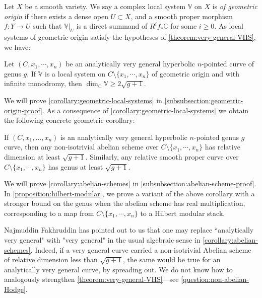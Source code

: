 Let $X$ be a smooth variety. We say a complex local system $\mathbb{V}$ on $X$ is \emph{of geometric origin} if there exists a dense open $U\subset X$, and a smooth proper morphism $f: Y\to U$ such that $\mathbb{V}|_U$ is a direct summand of $R^if_*\mathbb{C}$ for some $i\geq 0$. As local systems of geometric origin satisfy the hypotheses of \autoref{theorem:very-general-VHS}, we have:
\begin{corollary}
\notready\label{corollary:geometric-local-systems}
Let $(C, x_1, \cdots, x_n)$ be an analytically very general hyperbolic $n$-pointed curve of genus $g$. If $\mathbb{V}$ is a local system on $C\setminus\{x_1, \cdots, x_n\}$ of geometric origin and with infinite monodromy, then $\dim_{\mathbb{C}}\mathbb{V}\geq 2\sqrt{g+1}$.
\end{corollary}
We will prove \autoref{corollary:geometric-local-systems}
in \autoref{subsubsection:geometric-origin-proof}.
As a consequence of \autoref{corollary:geometric-local-systems}
we obtain the following concrete geometric corollary:
\begin{corollary}
\notready
	\label{corollary:abelian-schemes}
	If $(C, x_1, \ldots, x_n)$ is an analytically
very general hyperbolic $n$-pointed genus $g$ curve, then any non-isotrivial
abelian scheme over $C\setminus\{x_1, \cdots, x_n\}$  has relative dimension at least $\sqrt{g+1}$.
	Similarly, any relative smooth proper curve over $C\setminus\{x_1, \cdots, x_n\}$
	has genus at least $\sqrt{g+1}$.
\end{corollary}
We will prove \autoref{corollary:abelian-schemes}
in \autoref{subsubsection:abelian-scheme-proof}.
In \autoref{proposition:hilbert-modular},
we prove a variant of the above corollary
with a stronger bound on the genus
when the abelian scheme has real multiplication, corresponding to a map from
$C\setminus\{x_1, \cdots, x_n\}$ to a Hilbert modular stack.

\begin{remark}
\notready
	\label{remark:remove-analytic}
	Najmuddin Fakhruddin has pointed out to us that one may replace ``analytically very general" with "very general"
	in the usual algebraic sense in \autoref{corollary:abelian-schemes}. Indeed, if a very general curve carried a non-isotrivial Abelian scheme of relative dimension less than $\sqrt{g+1}$, the same would be true for an analytically very general curve, by spreading out.
	We do not know how to analogously strengthen \autoref{theorem:very-general-VHS}---see  \autoref{question:non-abelian-Hodge}.
\end{remark}

